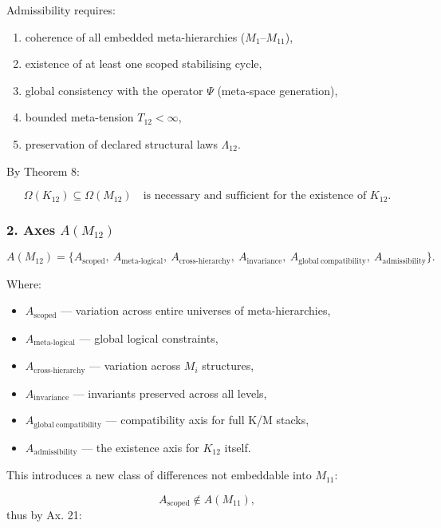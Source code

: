 Admissibility requires:

\begin{enumerate}
    \item coherence of all embedded meta-hierarchies (\(M_1\)–\(M_{11}\)),
    \item existence of at least one scoped stabilising cycle,
    \item global consistency with the operator $\Psi$ (meta-space generation),
    \item bounded meta-tension $T_{12}<\infty$,
    \item preservation of declared structural laws $\Lambda_{12}$.
\end{enumerate}

By Theorem 8:

\[
\Omega(K_{12}) \subseteq \Omega(M_{12})
\quad \text{is necessary and sufficient for the existence of }K_{12}.
\]

\subsubsection*{2. Axes $A(M_{12})$}

\[
A(M_{12}) =
\{
A_{\mathrm{scoped}},\
A_{\mathrm{meta\mbox{-}logical}},\
A_{\mathrm{cross\mbox{-}hierarchy}},\
A_{\mathrm{invariance}},\
A_{\mathrm{global\ compatibility}},\
A_{\mathrm{admissibility}}
\}.
\]

Where:

\begin{itemize}
    \item $A_{\mathrm{scoped}}$ — variation across entire universes of meta-hierarchies,
    \item $A_{\mathrm{meta\mbox{-}logical}}$ — global logical constraints,
    \item $A_{\mathrm{cross\mbox{-}hierarchy}}$ — variation across $M_i$ structures,
    \item $A_{\mathrm{invariance}}$ — invariants preserved across all levels,
    \item $A_{\mathrm{global\ compatibility}}$ — compatibility axis for full K/M stacks,
    \item $A_{\mathrm{admissibility}}$ — the existence axis for $K_{12}$ itself.
\end{itemize}

This introduces a new class of differences not embeddable into $M_{11}$:

\[
A_{\mathrm{scoped}}\notin A(M_{11}),
\]
thus by Ax. 21:

